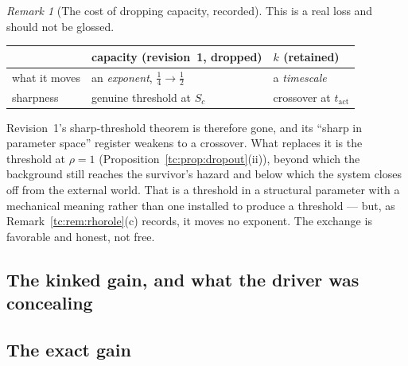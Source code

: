 \documentclass[11pt]{article}
\numberwithin{equation}{section}
\theoremstyle{plain}
\theoremstyle{definition}
\theoremstyle{remark}
\newtheorem{remark}[theorem]{Remark}
\begin{document}
\begin{remark}[The cost of dropping capacity, recorded]
\label{tc:rem:cost}
This is a real loss and should not be glossed.
\begin{center}\small
\begin{tabular}{@{}lll@{}}
\toprule
& capacity (revision~1, dropped) & $k$ (retained)\\
\midrule
what it moves & an \emph{exponent}, $\tfrac14\to\tfrac12$ &
a \emph{timescale}\\
sharpness & genuine threshold at $S_c$ & crossover at
$t_{\mathrm{act}}$\\
\bottomrule
\end{tabular}
\end{center}
Revision~1's sharp-threshold theorem is therefore gone, and its ``sharp
in parameter space'' register weakens to a crossover. What replaces it
is the threshold at $\rho=1$
(Proposition~\ref{tc:prop:dropout}(ii)), beyond which the background
still reaches the survivor's hazard and below which the system closes
off from the external world. That is a threshold in a structural
parameter with a mechanical meaning rather than one installed to produce
a threshold --- but, as Remark~\ref{tc:rem:rhorole}(c) records, it moves
no exponent. The exchange is favorable and honest, not free.
\end{remark}

\subsection{The kinked gain, and what the driver was concealing}
\label{tc:sub:gain}

\subsection{The exact gain}\label{tc:subsub:gain}
\end{document}
